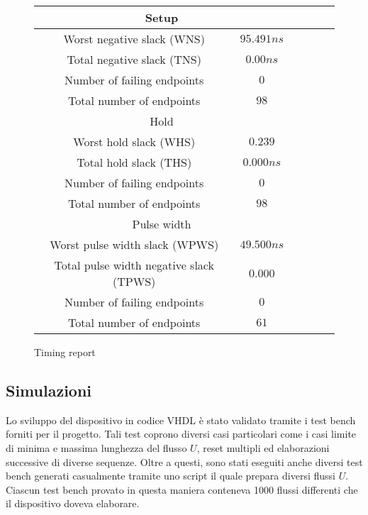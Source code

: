 \begin{figure}[!ht]
    \centering
    \begin{tabular}{|c|c|c|c|c|c|}
        \hline
        \multicolumn{2}{|c|}{Setup}                          \\
        \hline
        Worst negative slack (WNS)              & $95.491ns$ \\
        \hline
        Total negative slack (TNS)              & $0.00ns$   \\
        \hline
        Number of failing endpoints             & $0$        \\
        \hline
        Total number of endpoints               & $98$       \\
        \hline
        \multicolumn{2}{|c|}{Hold}                           \\
        \hline
        Worst hold slack (WHS)                  & $0.239$    \\
        \hline
        Total hold slack (THS)                  & $0.000ns$  \\
        \hline
        Number of failing endpoints             & $0$        \\
        \hline
        Total number of endpoints               & $98$       \\
        \hline
        \multicolumn{2}{|c|}{Pulse width}                    \\
        \hline
        Worst pulse width slack (WPWS)          & $49.500ns$ \\
        \hline
        Total pulse width negative slack (TPWS) & $0.000$    \\
        \hline
        Number of failing endpoints             & $0$        \\
        \hline
        Total number of endpoints               & $61$       \\
        \hline
    \end{tabular}
    \caption{Timing report}
    \label{table:timingreport}
\end{figure}

\subsection{Simulazioni}

Lo sviluppo del dispositivo in codice VHDL è stato validato tramite i test bench forniti per il progetto. Tali test coprono diversi casi particolari come i casi limite di minima e massima lunghezza del flusso $U$, reset multipli ed elaborazioni successive di diverse sequenze. Oltre a questi, sono stati eseguiti anche diversi test bench generati casualmente tramite uno script il quale prepara diversi flussi $U$. Ciascun test bench provato in questa maniera conteneva 1000 flussi differenti che il dispositivo doveva elaborare.

